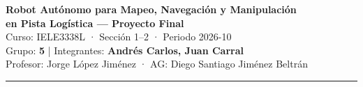 \documentclass[10pt,a4paper]{article}
\begin{document}
\begin{center}
  {\large\bfseries\color{uniblue}
    Robot Autónomo para Mapeo, Navegación y Manipulación\\[2pt]
    en Pista Logística — Proyecto Final}\\[4pt]
  {\small
    Curso: IELE3338L · Sección 1--2 · Periodo 2026-10\\
    Grupo: \textbf{5} \quad|\quad
    Integrantes: \textbf{Andrés Carlos, Juan Carral}\\
    Profesor: Jorge López Jiménez · AG: Diego Santiago Jiménez Beltrán}
\end{center}
\vspace{-4pt}
\noindent\rule{\linewidth}{0.8pt}
\vspace{2pt}
\end{document}
